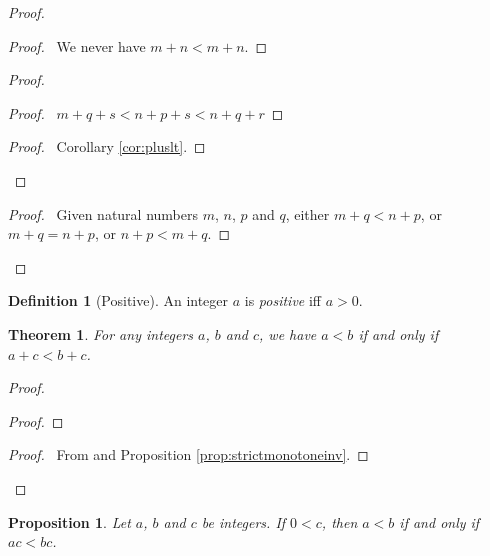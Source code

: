 \documentclass{book}
\let\qed\relax
\newtheorem{prop}[ax]{Proposition}
\newtheorem{thm}[ax]{Theorem}
\theoremstyle{definition}
\newtheorem{df}[ax]{Definition}
\begin{document}
\begin{proof}
	\pf
	\begin{proof}
		\pf\ We never have $m + n < m + n$.
	\end{proof}
	\begin{proof}
		\begin{proof}
			\pf\ $m + q + s < n + p + s < n + q + r$
		\end{proof}
		\begin{proof}
			\pf\ Corollary \ref{cor:pluslt}.
		\end{proof}
	\end{proof}
	\begin{proof}
		\pf\ Given natural numbers $m$, $n$, $p$ and $q$, either $m +q < n + p$, or $m + q = n + p$, or $n + p < m + q$.
	\end{proof}
	\qed
\end{proof}

\begin{df}[Positive]
An integer $a$ is \emph{positive} iff $a > 0$.
\end{df}

\begin{thm}
For any integers $a$, $b$ and $c$, we have $a < b$ if and only if $a + c < b + c$.
\end{thm}

\begin{proof}
\pf
{}
\begin{proof}
\end{proof}
\begin{proof}
	\pf\ From  and Proposition \ref{prop:strictmonotoneinv}.
\end{proof}
\qed
\end{proof}

\begin{prop}
Let $a$, $b$ and $c$ be integers. If $0 < c$, then $a < b$ if and only if $ac < bc$.
\end{prop}
\end{document}
